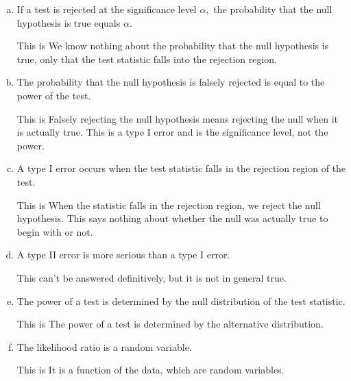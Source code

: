 \documentclass{article}
\begin{document}
\begin{itemize}
\begin{enumerate}[a.]
			\item If a test is rejected at the significance level $\alpha,$ the probability that the null hypothesis is true equals $\alpha.$
				\begin{answer*}
					This is  We know nothing about the probability that the null hypothesis is true, only that the test statistic falls into the rejection region.
				\end{answer*}

			\item The probability that the null hypothesis is falsely rejected is equal to the power of the test.
				\begin{answer*}
					This is  Falsely rejecting the null hypothesis means rejecting the null when it is actually true. This is a type I error and is the significance level, not the power.
				\end{answer*}

			\item A type I error occurs when the test statistic falls in the rejection region of the test.
				\begin{answer*}
					This is  When the statistic falls in the rejection region, we reject the null hypothesis. This says nothing about whether the null was actually true to begin with or not.
				\end{answer*}

			\item A type II error is more serious than a type I error.
				\begin{answer*}
					This can't be answered definitively, but it is not in general true.
				\end{answer*}

			\item The power of a test is determined by the null distribution of the test statistic.
				\begin{answer*}
					This is  The power of a test is determined by the alternative distribution.
				\end{answer*}

			\item The likelihood ratio is a random variable.
				\begin{answer*}
					This is  It is a function of the data, which are random variables.
				\end{answer*}
				
		\end{enumerate}


\end{itemize}
\end{document}

